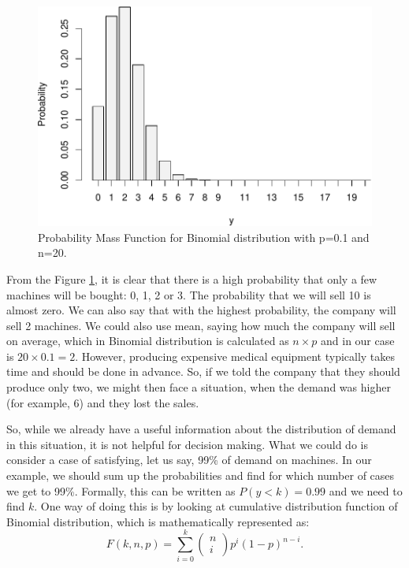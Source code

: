 \documentclass[
]{book}
\theoremstyle{definition}
\theoremstyle{definition}
\theoremstyle{definition}
\theoremstyle{definition}
\theoremstyle{remark}
\begin{document}
\begin{figure}
\centering
\includegraphics{Svetunkov---Statistics-for-Business-Analytics_files/figure-latex/binomialPMF01-1.pdf}
\caption{\label{fig:binomialPMF01}Probability Mass Function for Binomial distribution with p=0.1 and n=20.}
\end{figure}

From the Figure \ref{fig:binomialPMF01}, it is clear that there is a high probability that only a few machines will be bought: 0, 1, 2 or 3. The probability that we will sell 10 is almost zero. We can also say that with the highest probability, the company will sell 2 machines. We could also use mean, saying how much the company will sell on average, which in Binomial distribution is calculated as \(n \times p\) and in our case is \(20 \times 0.1 = 2\). However, producing expensive medical equipment typically takes time and should be done in advance. So, if we told the company that they should produce only two, we might then face a situation, when the demand was higher (for example, 6) and they lost the sales.

So, while we already have a useful information about the distribution of demand in this situation, it is not helpful for decision making. What we could do is consider a case of satisfying, let us say, 99\% of demand on machines. In our example, we should sum up the probabilities and find for which number of cases we get to 99\%. Formally, this can be written as \(P(y<k)=0.99\) and we need to find \(k\). One way of doing this is by looking at cumulative distribution function of Binomial distribution, which is mathematically represented as:
\begin{equation}
    F(k, n, p) = \sum_{i=0}^k \begin{pmatrix} n \\ i \end{pmatrix} p^i (1-p)^{n-i} .
    \label{eq:BinomialCDF}
\end{equation}
\end{document}
